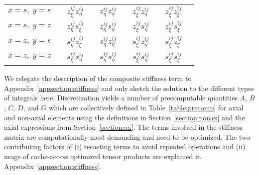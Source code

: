 \documentclass[11pt,letter,fleqn,english,notitlepage]{article}
\begin{document}
\begin{table*}
\begin{minipage}{156mm}
\begin{center}
\begin{tabular}{@{}llllll}
$x=s,\; y=s$ &$\hspace{1em} z_\xi^{ij} z_\eta^{ij} $
&$\hspace{1em} z_\eta^{ij} z_\eta^{ij}$ &$\hspace{1em} z_\xi^{ij} 
z_\eta^{ij}$ &$\hspace{1em} z_\xi^{ij} z_\xi^{ij}$ \\[5pt]
$x=s,\; y=z$ &$\hspace{1em} z_\eta^{ij} s_\xi^{ij} $
&$\hspace{1em} z_\eta^{ij} s_\eta^{ij}$ &$\hspace{1em} z_\xi^{ij} 
s_\eta^{ij}$ &$\hspace{1em} z_\xi^{ij} s_\xi^{ij}$ \\[5pt]
$x=z,\; y=s$ &$\hspace{1em} s_\eta^{ij} z_\xi^{ij}$
&$\hspace{1em} s_\eta^{ij} z_\eta^{ij}$ &$\hspace{1em} s_\xi^{ij} 
z_\eta^{ij}$ &$\hspace{1em} s_\xi^{ij} z_\xi^{ij}$ \\[5pt]
$x=z,\; y=z$ &$\hspace{1em} s_\xi^{ij} s_\eta^{ij}$ &$\hspace{1em}
s_\eta^{ij} s_\eta^{ij} $&$\hspace{1em} s_\xi^{ij} 
s_\eta^{ij}$ &$\hspace{1em} s_\xi^{ij} s_\xi^{ij}$ \\[5pt] 
\hline 
\end{tabular}
\end{center}
\end{minipage}
\end{table*}
%
We relegate the description of the composite stiffness term to 
Appendix~\ref{appsection:stiffness} and only sketch the solution to the 
different types of integrals here.
Discretization yields a number of precomputable quantities 
$A$, $B$, $C$, $D$, and $G$ which are collectively defined 
in Table~\ref{table:precomp} for axial and non-axial elements using the 
definitions in Section~\ref{section:nonax} and the axial expressions from 
Section~\ref{section:ax}.
The terms involved in the stiffness matrix are computationally 
most demanding and need to be optimized. The two contributing factors of (i) 
recasting terms to avoid repeated operations and 
(ii) usage of cache-access optimized tensor products are 
explained in Appendix~\ref{appsection:stiffness}.
\end{document}
